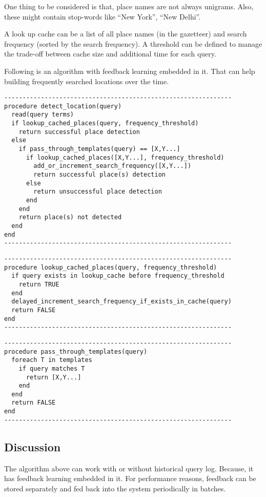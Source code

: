 \documentclass[letterpaper,12pt]{article}
\begin{document}
One thing to be considered is that, place names are not always unigrams. Also, these might contain stop-words like ``New York'', ``New Delhi''.

A look up cache can be a list of all place names (in the gazetteer) and search frequency (sorted by the search frequency). A threshold can be defined to manage the trade-off between cache size and additional time for each query.

Following is an algorithm with feedback learning embedded in it. That can help building frequently searched locations over the time.

\begin{verbatim}
--------------------------------------------------------------
procedure detect_location(query)
  read(query terms)
  if lookup_cached_places(query, frequency_threshold)
    return successful place detection
  else
    if pass_through_templates(query) == [X,Y...]
      if lookup_cached_places([X,Y...], frequency_threshold)
        add_or_increment_search_frequency([X,Y...])
        return successful place(s) detection
      else
        return unsuccessful place detection
      end
    end
    return place(s) not detected
  end
end
--------------------------------------------------------------
\end{verbatim}

\begin{verbatim}
--------------------------------------------------------------
procedure lookup_cached_places(query, frequency_threshold)
  if query exists in lookup_cache before frequency_threshold
    return TRUE
  end
  delayed_increment_search_frequency_if_exists_in_cache(query)
  return FALSE
end
--------------------------------------------------------------
\end{verbatim}

\begin{verbatim}
--------------------------------------------------------------
procedure pass_through_templates(query)
  foreach T in templates
    if query matches T
      return [X,Y...]
    end
  end
  return FALSE
end
--------------------------------------------------------------
\end{verbatim}


\subsection{Discussion}

The algorithm above can work with or without historical query log. Because, it has feedback learning embedded in it. For performance reasons, feedback can be stored separately and fed back into the system periodically in batches.
\end{document}
